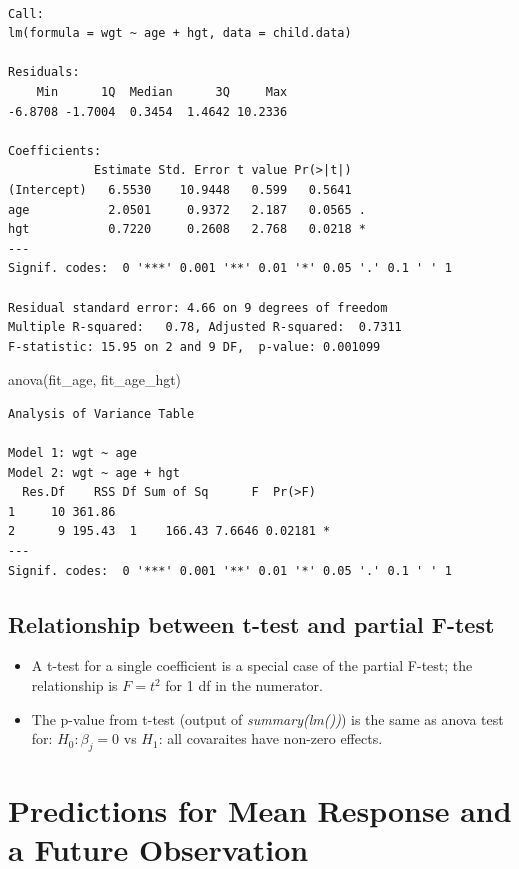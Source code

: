 \documentclass[
  letterpaper,
]{scrbook}
\newenvironment{Shaded}{\begin{snugshade}}{\end{snugshade}}
\newcommand{\FunctionTok}[1]{\textcolor[rgb]{0.28,0.35,0.67}{#1}}
\newcommand{\NormalTok}[1]{\textcolor[rgb]{0.00,0.23,0.31}{#1}}
\providecommand{\tightlist}{%
  \setlength{\itemsep}{0pt}\setlength{\parskip}{0pt}}\usepackage{longtable,booktabs,array}
\begin{document}
\begin{verbatim}

Call:
lm(formula = wgt ~ age + hgt, data = child.data)

Residuals:
    Min      1Q  Median      3Q     Max 
-6.8708 -1.7004  0.3454  1.4642 10.2336 

Coefficients:
            Estimate Std. Error t value Pr(>|t|)  
(Intercept)   6.5530    10.9448   0.599   0.5641  
age           2.0501     0.9372   2.187   0.0565 .
hgt           0.7220     0.2608   2.768   0.0218 *
---
Signif. codes:  0 '***' 0.001 '**' 0.01 '*' 0.05 '.' 0.1 ' ' 1

Residual standard error: 4.66 on 9 degrees of freedom
Multiple R-squared:   0.78, Adjusted R-squared:  0.7311 
F-statistic: 15.95 on 2 and 9 DF,  p-value: 0.001099
\end{verbatim}

\begin{Shaded}
\begin{Highlighting}[]
\FunctionTok{anova}\NormalTok{(fit\_age, fit\_age\_hgt)}
\end{Highlighting}
\end{Shaded}

\begin{verbatim}
Analysis of Variance Table

Model 1: wgt ~ age
Model 2: wgt ~ age + hgt
  Res.Df    RSS Df Sum of Sq      F  Pr(>F)  
1     10 361.86                              
2      9 195.43  1    166.43 7.6646 0.02181 *
---
Signif. codes:  0 '***' 0.001 '**' 0.01 '*' 0.05 '.' 0.1 ' ' 1
\end{verbatim}

\subsection{Relationship between t-test and partial
F-test}\label{relationship-between-t-test-and-partial-f-test}

\begin{itemize}
\tightlist
\item
  A t-test for a single coefficient is a special case of the partial
  F-test; the relationship is \(F = t^2\) for 1 df in the numerator.
\item
  The p-value from t-test (output of \emph{summary(lm())}) is the same
  as anova test for: \(H_0: \beta_j = 0\) vs \(H_1\): all covaraites
  have non-zero effects.
\end{itemize}

\section{Predictions for Mean Response and a Future
Observation}\label{predictions-for-mean-response-and-a-future-observation}
\end{document}
